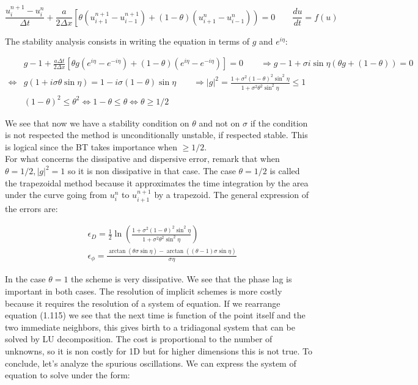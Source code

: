 \begin{equation}
\frac{u_i^{n+1}-u_i^n}{\Delta t} + \frac{a}{2\Delta x} \left[ \theta (u_{i+1}^{n+1}-u_{i-1}^{n+1})+ (1-\theta )(u_{i+1}^n - u_{i-1}^n)  \right) = 0 \qquad \frac{du}{dt} = f(u)
\end{equation}

The stability analysis consists in writing the equation in terms of $g$ and $e^{i\eta}$:

\begin{equation}
\begin{aligned}
&g-1 + \frac{a \Delta t}{2\Delta x} \left[ \theta g(e^{i\eta}-e^{-i\eta})+ (1-\theta )(e^{i\eta}-e^{-i\eta})  \right] = 0 \qquad \Rightarrow g-1 +\sigma i\sin \eta (\theta g+(1-\theta)) = 0\\ 
\Leftrightarrow &g(1+i \sigma \theta \sin \eta ) = 1- i\sigma (1-\theta)\sin \eta \qquad \Rightarrow |g|^2 = \frac{1+\sigma ^2 (1-\theta)^2 \sin ^2\eta}{1+\sigma ^2\theta ^2\sin ^2\eta} \leq 1 \\
&(1-\theta)^2 \leq \theta ^2 \Leftrightarrow 1-\theta \leq \theta \Leftrightarrow \theta \geq 1/2
\end{aligned}
\end{equation}

We see that now we have a stability condition on $\theta$ and not on $\sigma$ if the condition is not respected the method is unconditionally unstable, if respected stable. This is logical since the BT takes importance when $\geq 1/2$.\\

For what concerns the dissipative and dispersive error, remark that when $\theta = 1/2, |g|^2 = 1$ so it is non dissipative in that case. The case $\theta = 1/2$ is called the trapezoidal method because it approximates the time integration by the area under the curve going from $u^n_i$ to $u^{n+1}_{i+1}$ by a trapezoid. The general expression of the errors are: 

\begin{equation}
\begin{aligned}
&\epsilon _D = \frac{1}{2}\ln \left( \frac{1+\sigma ^2 (1-\theta)^2 \sin ^2\eta}{1+\sigma ^2\theta ^2\sin ^2\eta} \right)\\
&\epsilon _\phi = \frac{\arctan (\theta \sigma \sin \eta) - \arctan ((\theta -1)\sigma \sin \eta)}{\sigma \eta}
\end{aligned}
\end{equation}

In the case $\theta = 1$ the scheme is very dissipative. We see that the phase lag is important in both cases. The resolution of implicit schemes is more costly because it requires the resolution of a system of equation. If we rearrange equation (1.115) we see that the next time is function of the point itself and the two immediate neighbors, this gives birth to a tridiagonal system that can be solved by LU decomposition. The cost is proportional to the number of unknowns, so it is non costly for 1D but for higher dimensions this is not true. To conclude, let's analyze the spurious oscillations. We can express the system of equation to solve under the form: 

